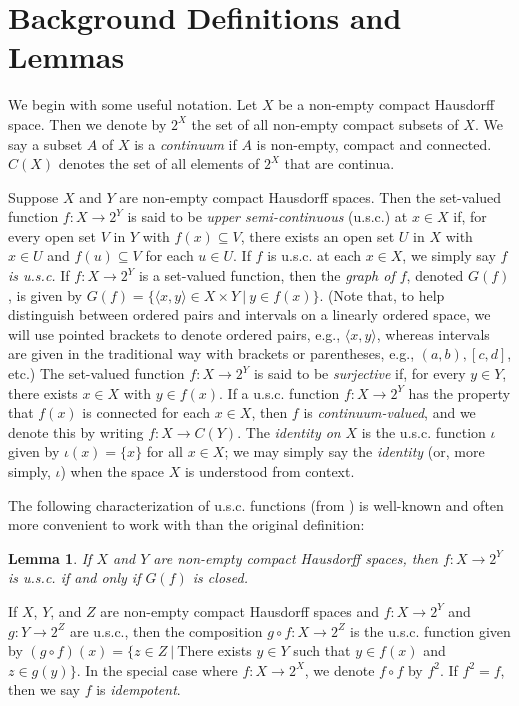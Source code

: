 \documentclass{amsart}
\newtheorem{lemma}[theorem]{Lemma}
\theoremstyle{definition}
\begin{document}
\section{Background Definitions and Lemmas}

We begin with some useful notation. Let $X$ be a non-empty compact Hausdorff space. Then we denote by $2^X$ the set of all non-empty compact subsets of $X$. We say a subset $A$ of $X$ is a \emph{continuum} if $A$ is non-empty, compact and connected. $C(X)$ denotes the set of all elements of $2^X$ that are continua.

Suppose $X$ and $Y$ are non-empty compact Hausdorff spaces. Then the set-valued function $f: X \rightarrow 2^{Y}$ is said to be \emph{upper semi-continuous} (u.s.c.) at $x \in X$ if, for every open set $V$ in $Y$ with $f(x) \subseteq V$, there exists an open set $U$ in $X$ with $x \in U$ and $f(u) \subseteq V$ for each $u \in U$. If $f$ is u.s.c. at each $x \in X$, we simply say \emph{$f$ is u.s.c.} If $f: X \rightarrow 2^{Y}$ is a set-valued function, then the \emph{graph of $f$}, denoted $G(f)$, is given by $G(f) = \{\langle x , y \rangle \in X \times Y \ | \ y \in f(x)\}$. (Note that, to help distinguish between ordered pairs and intervals on a linearly ordered space, we will use pointed brackets to denote ordered pairs, e.g., $\langle x , y \rangle$, whereas intervals are given in the traditional way with brackets or parentheses, e.g., $(a,b), [c,d]$, etc.) The set-valued function $f: X \rightarrow 2^{Y}$ is said to be \emph{surjective} if, for every $y \in Y$, there exists $x \in X$ with $y \in f(x)$. If a u.s.c. function $f: X \rightarrow 2^{Y}$ has the property that $f(x)$ is connected for each $x \in X$, then $f$ is \emph{continuum-valued}, and we denote this by writing  $f: X \rightarrow C(Y).$ The \emph{identity on} $X$ is the u.s.c. function $\iota$ given by $\iota(x) = \{x\}$ for all $x \in X$; we may simply say the \emph{identity} (or, more simply, $\iota$) when the space $X$ is understood from context.

The following characterization of u.s.c. functions (from \cite{i m paper}) is well-known and often more convenient to work with than the original definition:

\begin{lemma} If $X$ and $Y$ are non-empty compact Hausdorff spaces, then $f: X \rightarrow 2^{Y}$ is u.s.c. if and only if $G(f)$ is closed.
\end{lemma}

If $X$, $Y$, and $Z$ are non-empty compact Hausdorff spaces and $f : X \rightarrow 2^{Y}$ and $g: Y \rightarrow 2^{Z}$ are u.s.c., then the composition $g \circ f : X \rightarrow 2^{Z}$ is the u.s.c. function given by $(g \circ f)(x) = \{z \in Z \ | \ $There exists $y \in Y$ such that $y \in f(x)$ and $z \in g(y)\}$. In the special case where $f: X \rightarrow 2^{X}$, we denote $f \circ f$ by $f^2$. If $f^2 = f$, then we say $f$ is \emph{idempotent}.
\end{document}
